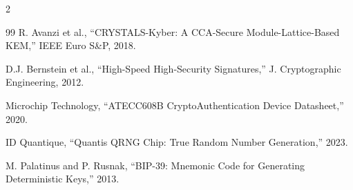 \documentclass[11pt,a4paper]{article}
\begin{document}
\begin{multicols}{2}
\begin{thebibliography}{99}
  R. Avanzi et al.,
  ``CRYSTALS-Kyber: A CCA-Secure Module-Lattice-Based KEM,''
  IEEE Euro S\&P, 2018.

  D.J. Bernstein et al.,
  ``High-Speed High-Security Signatures,''
  J. Cryptographic Engineering, 2012.

  Microchip Technology,
  ``ATECC608B CryptoAuthentication Device Datasheet,''
  2020.

  ID Quantique,
  ``Quantis QRNG Chip: True Random Number Generation,''
  2023.

  M. Palatinus and P. Rusnak,
  ``BIP-39: Mnemonic Code for Generating Deterministic Keys,''
  2013.

\end{thebibliography}

\end{multicols}
\end{document}
